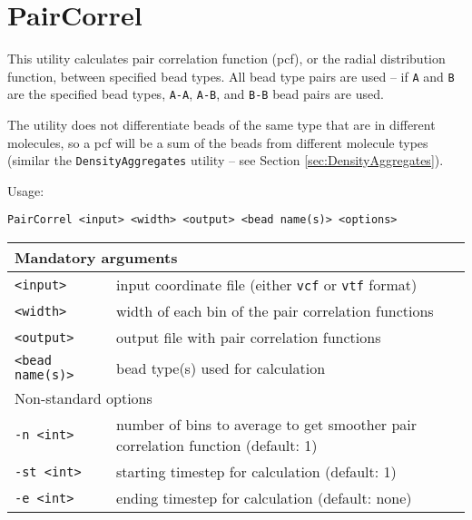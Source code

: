 \section{PairCorrel} \label{sec:PairCorrel}

This utility calculates pair correlation function (pcf), or the radial
distribution function, between specified bead types. All bead type pairs
are used -- if \texttt{A} and \texttt{B} are the specified bead types,
\texttt{A-A}, \texttt{A-B}, and \texttt{B-B} bead pairs are used.

The utility does not differentiate beads of the same type that are in
different molecules, so a pcf will be a sum of the beads from different
molecule types (similar the \texttt{DensityAggregates} utility -- see
Section \ref{sec:DensityAggregates}).

Usage:

\vspace{1em}
\noindent
\texttt{PairCorrel <input> <width> <output> <bead name(s)> <options>}

\noindent
\begin{longtable}{p{}p{}}
  \toprule
  \multicolumn{2}{l}{Mandatory arguments} \\
  \midrule
  \texttt{<input>} & input coordinate file (either \texttt{vcf} or
    \texttt{vtf} format) \\
  \texttt{<width>} & width of each bin of the pair correlation functions \\
  \texttt{<output>} & output file with pair correlation functions \\
  \texttt{<bead name(s)>} & bead type(s) used for calculation \\
  \toprule
  \multicolumn{2}{l}{Non-standard options} \\
  \midrule
  \texttt{-n <int>} & number of bins to average to get smoother pair
    correlation function (default: 1) \\
  \texttt{-st <int>} & starting timestep for calculation (default: 1) \\
  \texttt{-e <int>} & ending timestep for calculation (default: none) \\
  \bottomrule
\end{longtable}

